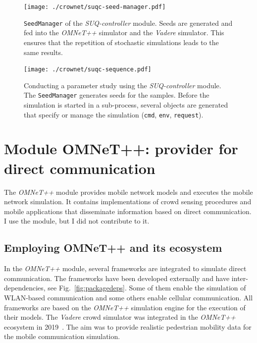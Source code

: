 \begin{figure}[H]
\centering
\texttt{[image: ./crownet/suqc-seed-manager.pdf]} 
\caption[SUQ-Controller: sub-package SeedManager]{\lstinline{SeedManager} of the \textit{SUQ-controller} module. Seeds are generated and fed into the \textit{OMNeT++} simulator and the \textit{Vadere} simulator. This ensures that the repetition of stochastic simulations leads to the same results.}
\label{fig:seedmanager}
\end{figure}
\begin{figure}[H]
\texttt{[image: ./crownet/suqc-sequence.pdf]} 
\caption[Sequence diagram of a ]{Conducting a parameter study using the \textit{SUQ-controller} module. The \lstinline{SeedManager} generates seeds for the samples. Before the simulation is started in a sub-process, several objects are generated that specify or manage the simulation (\lstinline{cmd}, \lstinline{env}, \lstinline{request}).}
\label{fig:sequencesuqc}
\end{figure}

 

\section{Module OMNeT++: provider for direct communication}
\label{sec:omnet}

The \textit{OMNeT++} module provides mobile network models and executes the mobile network simulation. It contains implementations of crowd sensing procedures and mobile applications that disseminate information based on direct communication. I use the module, but I did not contribute to it.


\subsection{Employing OMNeT++ and its ecosystem}

In the \textit{OMNeT++} module, several frameworks are integrated to simulate direct communication. The frameworks have been developed externally and have inter-dependencies, see Fig.~\ref{fig:packagedeps}. Some of them enable the simulation of WLAN-based communication and some others enable cellular communication. All frameworks are based on the \textit{OMNeT++} simulation engine for the execution of their models. The \textit{Vadere} crowd simulator was integrated in the \textit{OMNeT++} ecosystem in 2019~\cite{schuhbaeck-2019-com}. The aim was to provide  realistic pedestrian mobility data for the mobile communication simulation.


